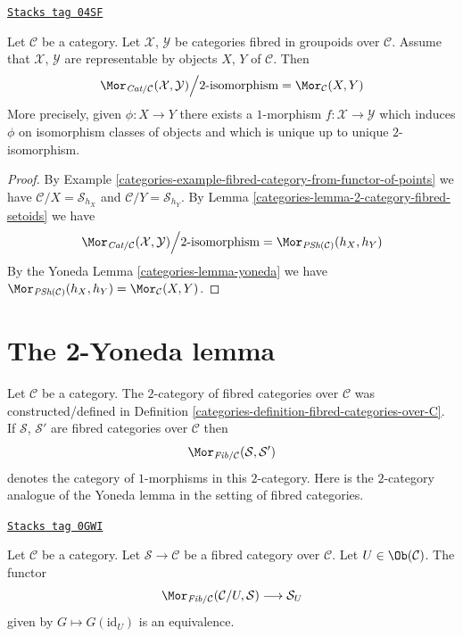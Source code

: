 \begin{lemma}
\label{categories-lemma-morphisms-representable-fibred-categories}
\href{https://stacks.math.columbia.edu/tag/04SF}{\texttt{Stacks tag 04SF}}

Let $\mathcal{C}$ be a category.
Let $\mathcal{X}$, $\mathcal{Y}$ be categories fibred in groupoids
over $\mathcal{C}$. Assume that $\mathcal{X}$, $\mathcal{Y}$
are representable by objects $X$, $Y$ of $\mathcal{C}$.
Then
$$
\Mor_{\textit{Cat}/\mathcal{C}}(\mathcal{X}, \mathcal{Y})
\Big/
2\text{-isomorphism}
=
\Mor_\mathcal{C}(X, Y)
$$
More precisely, given $\phi : X \to Y$ there exists a
$1$-morphism $f : \mathcal{X} \to \mathcal{Y}$ which induces
$\phi$ on isomorphism classes of objects and
which is unique up to unique $2$-isomorphism.
\end{lemma}

\begin{proof}

By
Example \ref{categories-example-fibred-category-from-functor-of-points}
we have $\mathcal{C}/X = \mathcal{S}_{h_X}$ and
$\mathcal{C}/Y = \mathcal{S}_{h_Y}$. By
Lemma \ref{categories-lemma-2-category-fibred-setoids}
we have
$$
\Mor_{\textit{Cat}/\mathcal{C}}(\mathcal{X}, \mathcal{Y})
\Big/
2\text{-isomorphism}
=
\Mor_{\textit{PSh}(\mathcal{C})}(h_X, h_Y)
$$
By the Yoneda
Lemma \ref{categories-lemma-yoneda}
we have $\Mor_{\textit{PSh}(\mathcal{C})}(h_X, h_Y)
= \Mor_\mathcal{C}(X, Y)$.
\end{proof}

\section{The 2-Yoneda lemma}
\label{categories-section-2-yoneda}
Let $\mathcal{C}$ be a category. The $2$-category of fibred categories
over $\mathcal{C}$ was constructed/defined in
Definition \ref{categories-definition-fibred-categories-over-C}.
If $\mathcal{S}$, $\mathcal{S}'$ are fibred categories
over $\mathcal{C}$ then
$$
\Mor_{\textit{Fib}/\mathcal{C}}(\mathcal{S}, \mathcal{S}')
$$
denotes the category of $1$-morphisms in this $2$-category.
Here is the $2$-category analogue of the Yoneda lemma
in the setting of fibred categories.

\begin{lemma}

\label{categories-lemma-yoneda-2category-fibred}
\href{https://stacks.math.columbia.edu/tag/0GWI}{\texttt{Stacks tag 0GWI}}

Let $\mathcal{C}$ be a category.
Let $\mathcal{S} \to \mathcal{C}$ be a fibred category over $\mathcal{C}$.
Let $U \in \Ob(\mathcal{C})$.
The functor
$$
\Mor_{\textit{Fib}/\mathcal{C}}(\mathcal{C}/U, \mathcal{S})
\longrightarrow
\mathcal{S}_U
$$
given by $G \mapsto G(\text{id}_U)$ is an equivalence.
\end{lemma}

